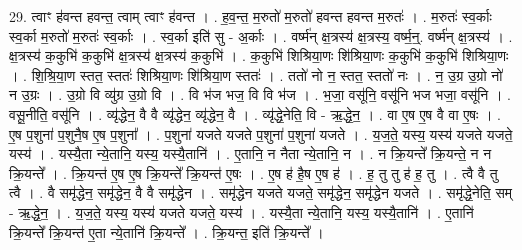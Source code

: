 \documentclass[17pt]{extarticle}
\begin{document}
29. त्वाꣳ ह॑वन्त हवन्त॒ त्वाम् त्वाꣳ ह॑वन्त । . ह॒व॒न्त॒ म॒रुतो॑ म॒रुतो॑ हवन्त हवन्त म॒रुतः॑ । . म॒रुतः॑ स्व॒र्काः स्व॒र्का म॒रुतो॑ म॒रुतः॑ स्व॒र्काः । . स्व॒र्का इति॑ सु - अ॒र्काः । . वर्ष्म॑न् क्ष॒त्रस्य॑ क्ष॒त्रस्य॒ वर्ष्म॒न्॒. वर्ष्म॑न् क्ष॒त्रस्य॑ । . क्ष॒त्रस्य॑ क॒कुभि॑ क॒कुभि॑ क्ष॒त्रस्य॑ क्ष॒त्रस्य॑ क॒कुभि॑ । . क॒कुभि॑ शिश्रिया॒णः शि॑श्रिया॒णः क॒कुभि॑ क॒कुभि॑ शिश्रिया॒णः । . शि॒श्रि॒या॒ण स्तत॒ स्ततः॑ शिश्रिया॒णः शि॑श्रिया॒ण स्ततः॑ । . ततो॑ नो न॒ स्तत॒ स्ततो॑ नः । . न॒ उ॒ग्र उ॒ग्रो नो॑ न उ॒ग्रः । . उ॒ग्रो वि व्यु॑ग्र उ॒ग्रो वि । . वि भ॑ज भज॒ वि वि भ॑ज । . भ॒जा॒ वसू॑नि॒ वसू॑नि भज भजा॒ वसू॑नि । . वसू॒नीति॒ वसू॑नि । . व्यृ॑द्धेन॒ वै वै व्यृ॑द्धेन॒ व्यृ॑द्धेन॒ वै । . व्यृ॑द्धे॒नेति॒ वि - ऋ॒द्धे॒न॒ । . वा ए॒ष ए॒ष वै वा ए॒षः । . ए॒ष प॒शुना॑ प॒शुनै॒ष ए॒ष प॒शुना᳚ । . प॒शुना॑ यजते यजते प॒शुना॑ प॒शुना॑ यजते । . य॒ज॒ते॒ यस्य॒ यस्य॑ यजते यजते॒ यस्य॑ । . यस्यै॒ता न्ये॒तानि॒ यस्य॒ यस्यै॒तानि॑ । . ए॒तानि॒ न नैता न्ये॒तानि॒ न । . न क्रि॒यन्ते᳚ क्रि॒यन्ते॒ न न क्रि॒यन्ते᳚ । . क्रि॒यन्त॑ ए॒ष ए॒ष क्रि॒यन्ते᳚ क्रि॒यन्त॑ ए॒षः । . ए॒ष ह॑ है॒ष ए॒ष ह॑ । . ह॒ तु तु ह॑ ह॒ तु । . त्वै वै तु त्वै । . वै समृ॑द्धेन॒ समृ॑द्धेन॒ वै वै समृ॑द्धेन । . समृ॑द्धेन यजते यजते॒ समृ॑द्धेन॒ समृ॑द्धेन यजते । . समृ॑द्धे॒नेति॒ सम् - ऋ॒द्धे॒न॒ । . य॒ज॒ते॒ यस्य॒ यस्य॑ यजते यजते॒ यस्य॑ । . यस्यै॒ता न्ये॒तानि॒ यस्य॒ यस्यै॒तानि॑ । . ए॒तानि॑ क्रि॒यन्ते᳚ क्रि॒यन्त॑ ए॒ता न्ये॒तानि॑ क्रि॒यन्ते᳚ । . क्रि॒यन्त॒ इति॑ क्रि॒यन्ते᳚ । \newline
\end{document}
